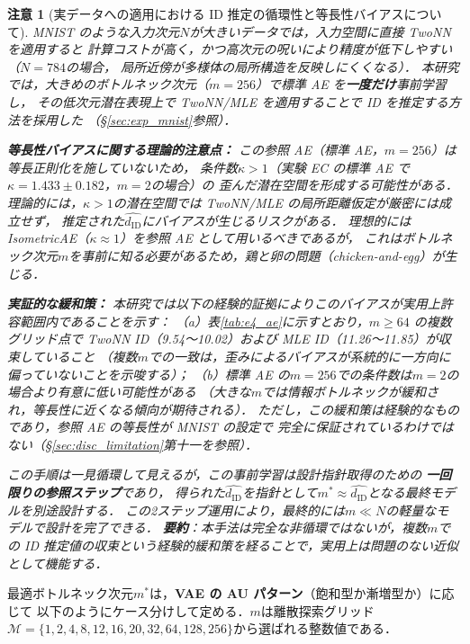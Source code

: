 \documentclass[12pt,a4paper]{jsarticle}
\newtheorem{remark}{注意}
\newcommand{\dID}{d_{\mathrm{ID}}}
\newcommand{\dz}{m}                         %
\newcommand{\dzopt}{m^*}                    %
\newcommand{\kap}{\kappa}
\begin{document}
\begin{remark}[実データへの適用における ID 推定の循環性と等長性バイアスについて]\label{rem:circularity}
MNIST のような入力次元$N$が大きいデータでは，入力空間に直接 TwoNN を適用すると
計算コストが高く，かつ高次元の呪いにより精度が低下しやすい（$N = 784$の場合，
局所近傍が多様体の局所構造を反映しにくくなる）．
本研究では，大きめのボトルネック次元（$m = 256$）で標準 AE を\textbf{一度だけ}事前学習し，
その低次元潜在表現上で TwoNN/MLE を適用することで ID を推定する方法を採用した
（§\ref{sec:exp_mnist}参照）．

\textbf{等長性バイアスに関する理論的注意点：}
この参照 AE（標準 AE，$m = 256$）は等長正則化を施していないため，
条件数$\kap > 1$（実験 EC の標準 AE で$\kap = 1.433\pm0.182$，$m = 2$の場合）の
歪んだ潜在空間を形成する可能性がある．
理論的には，$\kap > 1$の潜在空間では TwoNN/MLE の局所距離仮定が厳密には成立せず，
推定された$\hat{\dID}$にバイアスが生じるリスクがある．
理想的には IsometricAE（$\kap \approx 1$）を参照 AE として用いるべきであるが，
これはボトルネック次元$m$を事前に知る必要があるため，鶏と卵の問題（chicken-and-egg）が生じる．

\textbf{実証的な緩和策：}
本研究では以下の経験的証拠によりこのバイアスが実用上許容範囲内であることを示す：
（a）表\ref{tab:e4_ae}に示すとおり，$m \geq 64$ の複数グリッド点で
TwoNN ID（9.54〜10.02）および MLE ID（11.26〜11.85）が収束していること
（複数$m$での一致は，歪みによるバイアスが系統的に一方向に偏っていないことを示唆する）；
（b）標準 AE の$m = 256$での条件数は$m = 2$の場合より有意に低い可能性がある
（大きな$m$では情報ボトルネックが緩和され，等長性に近くなる傾向が期待される）．
ただし，この緩和策は経験的なものであり，参照 AE の等長性が MNIST の設定で
完全に保証されているわけではない（§\ref{sec:disc_limitation}第十一を参照）．

この手順は一見循環して見えるが，この事前学習は設計指針取得のための
\textbf{一回限りの参照ステップ}であり，
得られた$\hat{\dID}$を指針として$\dzopt \approx \hat{\dID}$となる最終モデルを別途設計する．
この2ステップ運用により，最終的には$m \ll N$の軽量なモデルで設計を完了できる．
\textbf{要約}：本手法は完全な非循環ではないが，複数$m$での ID 推定値の収束という経験的緩和策を経ることで，実用上は問題のない近似として機能する．
\end{remark}
最適ボトルネック次元$\dzopt$は，\textbf{VAE の AU パターン}（飽和型か漸増型か）に応じて
以下のようにケース分けして定める．$\dz$は離散探索グリッド
$\mathcal{M} = \{1, 2, 4, 8, 12, 16, 20, 32, 64, 128, 256\}$から選ばれる整数値である．
\end{document}
